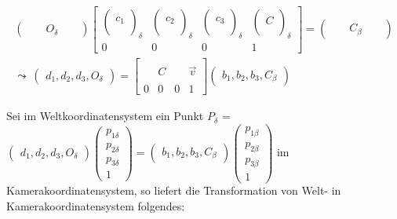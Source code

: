 \begin{gather}
\begin{pmatrix}
&&O_\delta&&
\end{pmatrix}
\begin{bmatrix}
\begin{pmatrix}\\c_1\\\\ \end{pmatrix}_\delta & \begin{pmatrix}\\c_2\\\\ \end{pmatrix}_\delta & \begin{pmatrix}\\c_3\\\\ \end{pmatrix}_\delta & \begin{pmatrix}\\C\\\\ \end{pmatrix}_\delta\\
0&0&0&1
\end{bmatrix} = \begin{pmatrix}
&&C_\beta&&
\end{pmatrix}\\
\leadsto \: 
\begin{pmatrix}
d_1,d_2,d_3,O_\delta
\end{pmatrix} = 
\begin{bmatrix}
&  &  & \\
&  C&  &\vec{v} \\ 
&  &  & \\
0&0&0 & 1
\end{bmatrix}
\begin{pmatrix}
b_1,b_2,b_3,C_\beta
\end{pmatrix}
\end{gather}

Sei im Weltkoordinatensystem ein Punkt \ensuremath{P_\delta} = \ensuremath{\begin{pmatrix}
		d_1,d_2,d_3,O_\delta
	\end{pmatrix} 
	\begin{pmatrix}
		p_{1\delta}\\p_{2\delta}\\p_{3\delta}\\1
	\end{pmatrix} = 
	\begin{pmatrix}
		b_1,b_2,b_3,C_\beta
	\end{pmatrix} 
	\begin{pmatrix}
	p_{1\beta}\\
	p_{2\beta}\\
	p_{3\beta}\\
		1 
\end{pmatrix}} im Kamerakoordinatensystem, so liefert die Transformation von Welt- in  Kamerakoordinatensystem folgendes:

